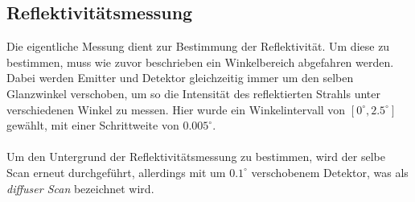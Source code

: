 \subsection{Reflektivitätsmessung}
Die eigentliche Messung dient zur Bestimmung der Reflektivität. Um diese zu bestimmen, muss wie zuvor beschrieben ein Winkelbereich abgefahren werden. Dabei werden Emitter und Detektor gleichzeitig immer um den selben Glanzwinkel verschoben, um so die Intensität des reflektierten Strahls unter verschiedenen Winkel zu messen. Hier wurde ein Winkelintervall von $[0^\circ,2.5^\circ]$ gewählt, mit einer Schrittweite von $0.005^\circ$.\\
\\
Um den Untergrund der Reflektivitätsmessung zu bestimmen, wird der selbe Scan erneut durchgeführt, allerdings mit um $0.1^\circ$ verschobenem Detektor, was als \textit{diffuser Scan} bezeichnet wird. 
